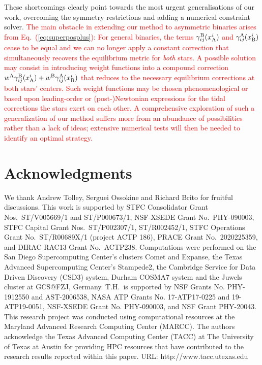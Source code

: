 \documentclass[]{iopart}
\newcommand{\new}[1]{\textcolor{red}{#1}}
\begin{document}
These shortcomings clearly point
towards the most urgent generalisations of our work, overcoming the
symmetry restrictions and adding a numerical constraint solver.
\new{
The main obstacle in extending our method to asymmetric
binaries arises from Eq.~(\ref{eq:superposplus}): For general
binaries, the terms $\gamma_{ij}^{\rm B}(x^i_{\rm A})$
and $\gamma_{ij}^{\rm A}(x^i_{\rm B})$ cease to be equal
and we can no longer apply a constant correction that simultaneously
recovers the equilibrium metric for {\it both} stars.
A possible solution may consist in introducing weight functions
into a compound correction
$w^{\rm A}\gamma^{\rm B}_{ij}(x^i_{\rm A})
+w^{\rm B}\gamma^{\rm A}_{ij}(x^i_{\rm B})$
that reduces to the necessary equilibrium corrections at
both stars' centers. Such weight functions may be chosen
phenomenological or based
upon leading-order or (post-)Newtonian expressions for the
tidal corrections the stars exert on each other. A comprehensive
exploration of such a generalization of our method suffers more
from an abundance of possibilities rather than a lack of ideas;
extensive numerical tests will then be needed to identify an
optimal strategy.}

\section*{Acknowledgments}
We thank Andrew Tolley, Serguei Ossokine and Richard Brito for
fruitful discussions.
This work is supported by
STFC Consolidator Grant Nos.~ST/V005669/1 and ST/P000673/1,
NSF-XSEDE Grant No.~PHY-090003,
STFC Capital Grant Nos.~ST/P002307/1, ST/R002452/1,
STFC Operations Grant No.~ST/R00689X/1 (project ACTP 186),
PRACE Grant No.~2020225359,
and
DIRAC RAC13 Grant No.~ACTP238.
Computations were performed on
the San Diego Supercomputing Center's clusters Comet and Expanse,
the Texas Advanced Supercomputing Center's Stampede2,
the Cambridge Service for Data Driven Discovery (CSD3) system,
Durham COSMA7 system and the Juwels cluster at GCS@FZJ, Germany.
T.H.~is supported by NSF Grants No. PHY-1912550 and AST-2006538,
NASA ATP Grants No. 17-ATP17-0225 and 19-ATP19-0051, NSF-XSEDE Grant
No. PHY-090003, and NSF Grant PHY-20043.  This research project was
conducted using computational resources at the Maryland Advanced
Research Computing Center (MARCC).  The authors acknowledge the
Texas Advanced Computing Center (TACC) at The University of Texas
at Austin for providing HPC resources that have contributed to the
research results reported within this paper. URL:
http://www.tacc.utexas.edu \cite{10.1145/3311790.3396656}
\end{document}

